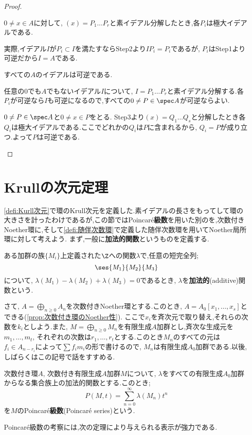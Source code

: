 \begin{proof}
\begin{step}
		\item $0\neq x\in A$に対して, $(x)=P_1\dots P_r$と素イデアル分解したとき,各$P_i$は極大イデアルである.
		
		実際,イデアル$I$が$P_i\subset I$を満たすならStep2より$IP_i=P_i$であるが, $P_i$はStep1より可逆だから$I=A$である.
		
		\item すべての$A$のイデアルは可逆である.
		
		任意の0でも$A$でもないイデアル$I$について, $I=P_1\dots P_r$と素イデアル分解する.各$P_i$が可逆なら$I$も可逆になるので,すべての$0\neq P\in\spec A$が可逆ならよい.
		
		$0\neq P\in\spec A$と$0\neq x\in P$をとる. Step3より$(x)=Q_1\dots Q_s$と分解したとき各$Q_i$は極大イデアルである.ここでどれかの$Q_i$は$P$に含まれるから, $Q_i=P$が成り立つ.よって$P$は可逆である.
	\end{step}
\end{proof}

\section{Krullの次元定理}
\ref{defi:Kurll次元}で環のKrull次元を定義した.素イデアルの長さをもってして環の大きさを計ったわけであるが,この節ではPoincar\'e\textbf{級数}を用いた別のを,次数付きNoether環に,そして\ref{defi:随伴次数環}で定義した随伴次数環を用いてNoether局所環に対して考えよう.
まず,一般に\textbf{加法的関数}というものを定義する.
\begin{defi}[加法的関数]
	ある加群の族$\{M_i\}$上定義された$\Z$への関数$\lambda$で,任意の短完全列;
	\[\ses{M_1}{M_2}{M_3}\]
	について, $\lambda(M_1)-\lambda(M_2)+\lambda(M_3)=0$であるとき, $\lambda$を\textbf{加法的}(additive)関数という.
\end{defi}

さて, $A=\bigoplus_{n\geq0}A_n$を次数付きNoether環とする.このとき, $A=A_0[x_1,\dots,x_s]$とできる(\ref{prop:次数付き環のNoether性}). ここで$x_i$を斉次元で取り替え,それらの次数を$k_i$としよう.また, $M=\bigoplus_{n\geq0}M_n$を有限生成$A$加群とし,斉次な生成元を$m_1,\dots,m_t$, それぞれの次数は$r_1,\dots,r_t$とする.このとき$M_n$のすべての元は$f_i\in A_{n-r_i}$によって$\sum f_im_i$の形で書けるので, $M_n$は有限生成$A_0$加群である.以後,しばらくはこの記号で話をすすめる.

\begin{defi}
	次数付き環$A$, 次数付き有限生成$A$加群$M$について, $\lambda$をすべての有限生成$A_0$加群からなる集合族上の加法的関数とする.このとき;
	\[P(M,t)=\sum_{n=0}^\infty \lambda(M_n)t^n\]
	を$M$のPoincar\'e\textbf{級数}(Poincar\'e series)という.
\end{defi}
Poincar\'e級数の考察には,次の定理により与えられる表示が強力である.

